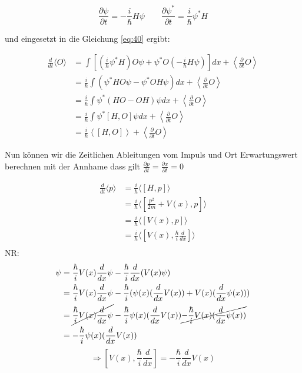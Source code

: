 \[ \frac{\partial \psi}{\partial t} = -\frac{i}{\hbar}H\psi \qquad \frac{\partial \psi^*}{\partial t} = \frac{i}{\hbar}\psi^* H   \]

und eingesetzt in die Gleichung \eqref{eq:40} ergibt:

\begin{align}
\frac{d}{dt}\langle  O\rangle  &=  \int \left[\left(\frac{i}{\hbar} \psi^* H\right) O\psi  + \psi^* O\left(-\frac{i}{\hbar} H\psi\right)\right]dx +  \left\langle  \frac{\partial}{\partial t} O\right\rangle\\
&=  \frac{i}{\hbar} \int ( \psi^* H O\psi  - \psi^* O H\psi)dx +  \left\langle  \frac{\partial}{\partial t} O\right\rangle\\
&=  \frac{i}{\hbar} \int \psi^* (  H O  -  O H )\psi dx +  \left\langle  \frac{\partial}{\partial t} O\right\rangle\\
&=  \frac{i}{\hbar} \int \psi^* [H, O]\psi dx +  \left\langle  \frac{\partial}{\partial t} O\right\rangle\\
&=  \frac{i}{\hbar} \left\langle [H, O]\right\rangle +  \left\langle  \frac{\partial}{\partial t} O\right\rangle
\end{align}






Nun können wir die Zeitlichen Ableitungen vom Impuls und Ort Erwartungswert berechnen mit der Annhame dass gilt \(\frac{\partial p}{\partial t} = \frac{\partial x}{\partial t} =  0 \)


\begin{align}
 \frac{d}{dt} \langle p \rangle  &= \frac{i}{\hbar} \langle [H,p]\rangle \\
&= \frac{i}{\hbar} \langle [\frac{p^2}{2m}+V(x),p]\rangle   \\
&= \frac{i}{\hbar} \langle [V(x),p]\rangle   \\
&= \frac{i}{\hbar} \langle [V(x),\frac{\hbar}{i}\frac{d}{dx} ]\rangle   \\
\end{align}
NR:
 \begin{align}
[V(x),\frac{\hbar}{i}\frac{d}{dx} ]\psi &=\frac{\hbar}{i} V(x)\frac{d}{dx} \psi - \frac{\hbar}{i}\frac{d}{dx}  (V(x)\psi)\\
&= \frac{\hbar}{i} V(x)\frac{d}{dx} \psi -\frac{\hbar}{i}(\psi(x) (\frac{d}{dx}  V(x)) + V(x) (\frac{d}{dx} \psi(x))  )  \\
&= \cancel{\frac{\hbar}{i} V(x)\frac{d}{dx} \psi} -\frac{\hbar}{i}\psi(x) (\frac{d}{dx}  V(x))\cancel{ -\frac{\hbar}{i} V(x) (\frac{d}{dx} \psi(x))}   \\
&=-\frac{\hbar}{i}\psi(x) (\frac{d}{dx}  V(x))
\end{align}
\[\Rightarrow [V(x),\frac{\hbar}{i}\frac{d}{dx} ] = -\frac{\hbar}{i} \frac{d}{dx}  V(x) \]


